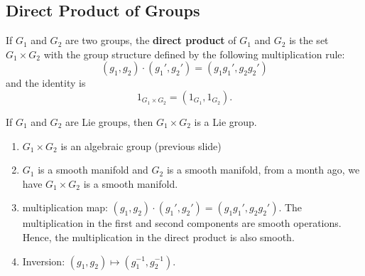\subsection{Direct Product of Groups}

\begin{definition}
   If \( {G}_{1} \) and \( {G}_{2} \) are two groups, the \textbf{direct product} of \( {G}_{1} \) and \( {G}_{2} \) is the set \( {G}_{1} \times {G}_{2} \) with the group structure defined by the following multiplication rule:
   \[  ({g}_{1}, {g}_{2}) \cdot ({g}_{1}', {g}_{2}') = ({g}_{1} {g}_{1}', {g}_{2} {g}_{2}') \]
   and the identity is 
   \[  {1}_{{G}_{1} \times {G}_{2}} = ({1}_{{G}_{1}}, {1}_{{G}_{2}} ). \]
\end{definition}

If \( {G}_{1}  \) and \( {G}_{2} \) are Lie groups, then \( {G}_{1} \times {G}_{2} \) is a Lie group.
\begin{enumerate}
    \item[(1)] \( {G}_{1} \times {G}_{2} \) is an algebraic group (previous slide)
    \item[(2)] \( {G}_{1} \) is a smooth manifold and \( {G}_{2}  \) is a smooth manifold, from a month ago, we have \( {G}_{1} \times {G}_{2} \) is a smooth manifold.
    \item[(3)] multiplication map: \( ({g}_{1}, {g}_{2}) \cdot ({g}_{1}', {g}_{2}') = ({g}_{1} {g}_{1}', {g}_{2} {g}_{2}') \).
        The multiplication in the first and second components are smooth operations. Hence, the multiplication in the direct product is also smooth.
    \item[(4)] Inversion: \( ({g}_{1}, {g}_{2}) \mapsto ({g}_{1}^{-1}, {g}_{2}^{-1}) \).
\end{enumerate}


